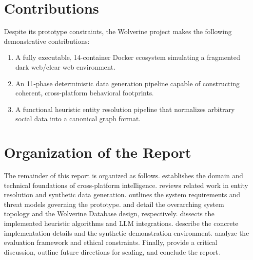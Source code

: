 \section{Contributions}
\label{sec:intro-contributions}
Despite its prototype constraints, the Wolverine project makes the following demonstrative contributions:
\begin{enumerate}
    \item A fully executable, 14-container Docker ecosystem simulating a fragmented dark web/clear web environment.
    \item An 11-phase deterministic data generation pipeline capable of constructing coherent, cross-platform behavioral footprints.
    \item A functional heuristic entity resolution pipeline that normalizes arbitrary social data into a canonical graph format.
\end{enumerate}

\section{Organization of the Report}
\label{sec:intro-organization}
The remainder of this report is organized as follows.  establishes the domain and technical foundations of cross-platform intelligence.  reviews related work in entity resolution and synthetic data generation.  outlines the system requirements and threat models governing the prototype.  and  detail the overarching system topology and the Wolverine Database design, respectively.  dissects the implemented heuristic algorithms and LLM integrations.  describe the concrete implementation details and the synthetic demonstration environment.  analyze the evaluation framework and ethical constraints. Finally,  provide a critical discussion, outline future directions for scaling, and conclude the report.
